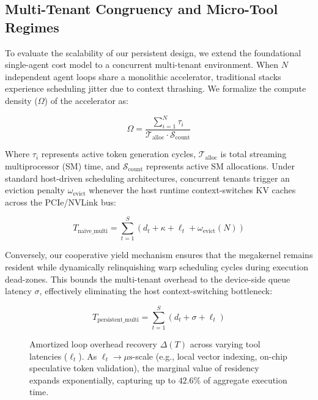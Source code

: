 
\subsection{Multi-Tenant Congruency and Micro-Tool Regimes}
To evaluate the scalability of our persistent design, we extend the foundational single-agent cost model to a concurrent multi-tenant environment. When $N$ independent agent loops share a monolithic accelerator, traditional stacks experience scheduling jitter due to context thrashing. We formalize the compute density ($\Omega$) of the accelerator as:

\begin{equation}
\Omega = \frac{\sum_{i=1}^{N} \tau_i}{\mathcal{T}_{\text{alloc}} \cdot \mathcal{S}_{\text{count}}}
\end{equation}

Where $\tau_i$ represents active token generation cycles, $\mathcal{T}_{\text{alloc}}$ is total streaming multiprocessor (SM) time, and $\mathcal{S}_{\text{count}}$ represents active SM allocations. Under standard host-driven scheduling architectures, concurrent tenants trigger an eviction penalty $\omega_{\text{evict}}$ whenever the host runtime context-switches KV caches across the PCIe/NVLink bus:

\begin{equation}
T_{\text{naive\_multi}} = \sum_{t=1}^{S} \left( d_t + \kappa + \ell_t + \omega_{\text{evict}}(N) \right)
\end{equation}

Conversely, our cooperative yield mechanism ensures that the megakernel remains resident while dynamically relinquishing warp scheduling cycles during execution dead-zones. This bounds the multi-tenant overhead to the device-side queue latency $\sigma$, effectively eliminating the host context-switching bottleneck:

\begin{equation}
T_{\text{persistent\_multi}} = \sum_{t=1}^{S} \left( d_t + \sigma + \ell_t \right)
\end{equation}

\begin{figure}[htbp]
    \centering
    \caption{Amortized loop overhead recovery $\Delta(T)$ across varying tool latencies ($\ell_t$). As $\ell_t \to \mu\text{s}$-scale (e.g., local vector indexing, on-chip speculative token validation), the marginal value of residency expands exponentially, capturing up to $42.6\%$ of aggregate execution time.}
    \label{fig:micro_tool_regime}
\end{figure}

